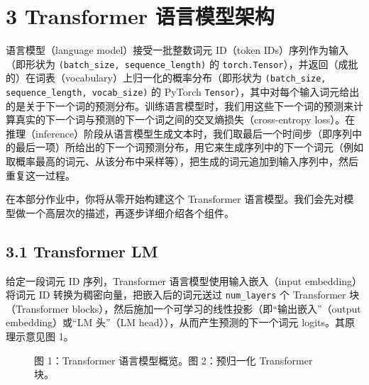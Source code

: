 \section*{3 Transformer 语言模型架构}

语言模型（language model）接受一批整数词元 ID（token IDs）序列作为输入（即形状为 \texttt{(batch\_size, sequence\_length)} 的 \texttt{torch.Tensor}），并返回（成批的）在词表（vocabulary）上归一化的概率分布（即形状为 \texttt{(batch\_size, sequence\_length, vocab\_size)} 的 PyTorch \texttt{Tensor}），其中对每个输入词元给出的是关于下一个词的预测分布。训练语言模型时，我们用这些下一个词的预测来计算真实的下一个词与预测的下一个词之间的交叉熵损失（cross-entropy loss）。在推理（inference）阶段从语言模型生成文本时，我们取最后一个时间步（即序列中的最后一项）所给出的下一个词预测分布，用它来生成序列中的下一个词元（例如取概率最高的词元、从该分布中采样等），把生成的词元追加到输入序列中，然后重复这一过程。

在本部分作业中，你将从零开始构建这个 Transformer 语言模型。我们会先对模型做一个高层次的描述，再逐步详细介绍各个组件。

\subsection*{3.1 Transformer LM}

给定一段词元 ID 序列，Transformer 语言模型使用输入嵌入（input embedding）将词元 ID 转换为稠密向量，把嵌入后的词元送过 \texttt{num\_layers} 个 Transformer 块（Transformer blocks），然后施加一个可学习的线性投影（即“输出嵌入”（output embedding）或“LM 头”（LM head）），从而产生预测的下一个词元 logits。其原理示意见图 1。

\begin{figure}[h]
\centering
{}
\caption*{图 1：Transformer 语言模型概览。\quad 图 2：预归一化 Transformer 块。}
\end{figure}

